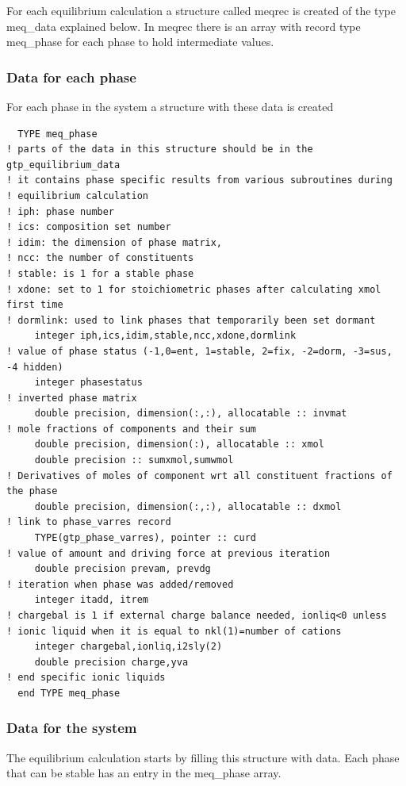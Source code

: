 \documentclass[12pt]{article}
\begin{document}
For each equilibrium calculation a structure called meqrec is created
of the type meq\_data explained below.  In meqrec there is an array
with record type meq\_phase for each phase to hold intermediate
values.

\subsubsection{Data for each phase}

For each phase in the system a structure with these data is created

{\small
\begin{verbatim}
  TYPE meq_phase
! parts of the data in this structure should be in the gtp_equilibrium_data
! it contains phase specific results from various subroutines during
! equilibrium calculation
! iph: phase number
! ics: composition set number
! idim: the dimension of phase matrix,
! ncc: the number of constituents
! stable: is 1 for a stable phase
! xdone: set to 1 for stoichiometric phases after calculating xmol first time
! dormlink: used to link phases that temporarily been set dormant
     integer iph,ics,idim,stable,ncc,xdone,dormlink
! value of phase status (-1,0=ent, 1=stable, 2=fix, -2=dorm, -3=sus, -4 hidden)
     integer phasestatus
! inverted phase matrix
     double precision, dimension(:,:), allocatable :: invmat
! mole fractions of components and their sum
     double precision, dimension(:), allocatable :: xmol
     double precision :: sumxmol,sumwmol
! Derivatives of moles of component wrt all constituent fractions of the phase
     double precision, dimension(:,:), allocatable :: dxmol
! link to phase_varres record
     TYPE(gtp_phase_varres), pointer :: curd
! value of amount and driving force at previous iteration
     double precision prevam, prevdg
! iteration when phase was added/removed
     integer itadd, itrem
! chargebal is 1 if external charge balance needed, ionliq<0 unless
! ionic liquid when it is equal to nkl(1)=number of cations
     integer chargebal,ionliq,i2sly(2)
     double precision charge,yva
! end specific ionic liquids
  end TYPE meq_phase
\end{verbatim}
}

\subsubsection{Data for the system}

The equilibrium calculation starts by filling this structure with
data.  Each phase that can be stable has an entry in the meq\_phase
array.
\end{document}
